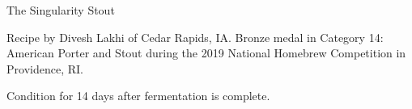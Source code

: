 \begin{recipe}{The Singularity Stout}

\begin{aboutblock}
Recipe by Divesh Lakhi of Cedar Rapids, IA. Bronze medal in Category 14:
American Porter and Stout during the 2019 National Homebrew Competition
in Providence, RI. \sourceaha
\end{aboutblock}


\begin{methodandtiming}
 
\begin{mashsteps}
\end{mashsteps}

\begin{fermentationsteps}
\end{fermentationsteps}

\begin{directions}
Condition for 14 days after fermentation is complete.
\end{directions}

\end{methodandtiming}

\recipebreak

\begin{ingredientsblock}

\begin{malts}
\end{malts}

\begin{hops}
\end{hops}


\end{ingredientsblock}

\end{recipe}
